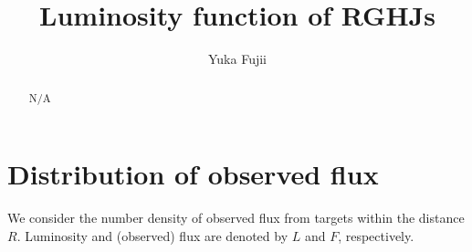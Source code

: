 \documentclass[12pt]{emulateapj}
\begin{document}
\renewcommand\bottomfraction{.9}
\newcommand{\PD}[2]{\frac{\partial {#1}}{\partial {#2}}}
\newcommand{\memoYF}[1]{\color{red} #1 \color{black}}

\title{Luminosity function of RGHJs}
\author{Yuka Fujii}

\begin{abstract}
N/A
\end{abstract} 


\section{Distribution of observed flux} 
\label{sec:luminosity function}





We consider the number density of observed flux from targets within the distance $R$. 
Luminosity and (observed) flux are denoted by $L$ and $F$, respectively. 
\vspace{1\baselineskip}
\end{document}
